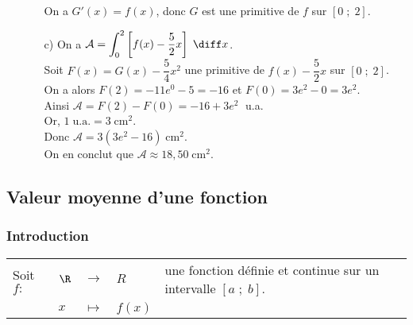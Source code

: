 \begin{itemize}
\begin{itemize}
\vspace*{.3cm}

On a $G'(x) = f(x)$, donc $G$ est une primitive de $f$ sur $\left[0 \; ; \; 2\right]$. \\

\item[c)] On a $\mathcal{A} = \displaystyle{\int_0^2 \left[f(x) - \dfrac{5}{2}x\right] \; \diff x}$. \\

Soit $F(x) = G(x) - \dfrac{5}{4}x^2$ une primitive de $f(x) - \dfrac{5}{2}x$ sur $\left[0 \; ; \; 2\right]$. \\

On a alors $F(2) = -11e^0 - 5 = -16$ et $F(0) = 3e^2 - 0 = 3e^2$. \\

Ainsi $\mathcal{A} = F(2) - F(0) = -16 + 3e^2 \;$ u.a. \\

Or, $1 \; \mathrm{u.a.} = 3 \; \mathrm{cm}^2$. \\

Donc $\mathcal{A} = 3\left(3e^2 - 16\right) \; \mathrm{cm}^2$. \\

On en conclut que $\mathcal{A} \approx 18,50 \; \mathrm{cm}^2$. 
\end{itemize}
\end{itemize}

\vspace*{-5cm}

\newpage

\vspace*{-1cm}

\subsection{Valeur moyenne d'une fonction}

\subsubsection{Introduction}

\begin{tabular}{lllll}
\hspace{-.3cm} Soit $f:$ & $\R$ & $\longrightarrow$ & $R$ & une fonction définie et continue sur un intervalle $\left[a \; ; \; b\right]$. \\
& $x$ & $\longmapsto$ & $f(x)$ & \\
\end{tabular}

